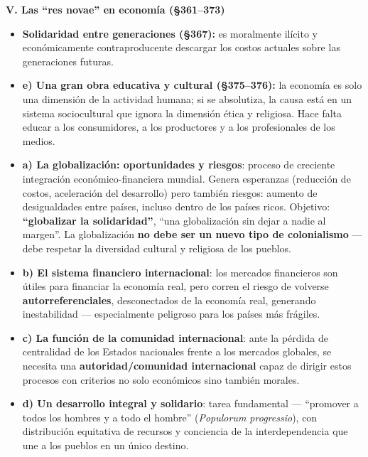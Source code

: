 \documentclass[10pt,a4paper]{article}
\begin{document}
\medskip\noindent \textbf{V. Las ``res novae'' en economía (\S{}361--373)}\par\nopagebreak
\begin{itemize}
\item \textbf{Solidaridad entre generaciones (\S{}367):} es moralmente ilícito y económicamente contraproducente descargar los costos actuales sobre las generaciones futuras.
\item \textbf{e) Una gran obra educativa y cultural (\S{}375--376):} la economía es solo una dimensión de la actividad humana; si se absolutiza, la causa está en un sistema sociocultural que ignora la dimensión ética y religiosa. Hace falta educar a los consumidores, a los productores y a los profesionales de los medios.
\item \textbf{a) La globalización: oportunidades y riesgos}: proceso de creciente integración económico-financiera mundial. Genera esperanzas (reducción de costos, aceleración del desarrollo) pero también riesgos: aumento de desigualdades entre países, incluso dentro de los países ricos. Objetivo: \textbf{``globalizar la solidaridad''}, ``una globalización sin dejar a nadie al margen''. La globalización \textbf{no debe ser un nuevo tipo de colonialismo} --- debe respetar la diversidad cultural y religiosa de los pueblos.
\item \textbf{b) El sistema financiero internacional}: los mercados financieros son útiles para financiar la economía real, pero corren el riesgo de volverse \textbf{autorreferenciales}, desconectados de la economía real, generando inestabilidad --- especialmente peligroso para los países más frágiles.
\item \textbf{c) La función de la comunidad internacional}: ante la pérdida de centralidad de los Estados nacionales frente a los mercados globales, se necesita una \textbf{autoridad/comunidad internacional} capaz de dirigir estos procesos con criterios no solo económicos sino también morales.
\item \textbf{d) Un desarrollo integral y solidario}: tarea fundamental --- ``promover a todos los hombres y a todo el hombre'' (\textit{Populorum progressio}), con distribución equitativa de recursos y conciencia de la interdependencia que une a los pueblos en un único destino.
\end{itemize}
\end{document}
